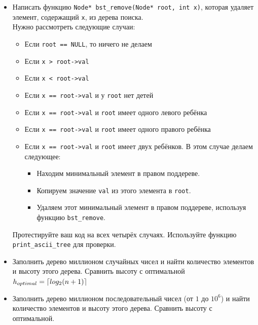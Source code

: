 \documentclass{article}
\DeclarePairedDelimiter\ceil{\lceil}{\rceil}
\begin{document}
\begin{itemize}
\item Написать функцию \texttt{Node* bst\_remove(Node* root, int x)}, которая удаляет элемент, содержащий \texttt{x}, из дерева поиска.\\
Нужно рассмотреть следующие случаи:
\begin{itemize}
\item Если \texttt{root == NULL}, то ничего не делаем
\item Если \texttt{x > root->val}
\item Если \texttt{x < root->val}
\item Если \texttt{x == root->val} и у \texttt{root} нет детей
\item Если \texttt{x == root->val} и \texttt{root} имеет одного левого ребёнка
\item Если \texttt{x == root->val} и \texttt{root} имеет одного правого ребёнка
\item Если \texttt{x == root->val} и \texttt{root} имеет двух ребёнков. В этом случае делаем следующее:
	\begin{itemize}
	\item Находим минимальный элемент в правом поддереве.
	\item Копируем значение \texttt{val} из этого элемента в \texttt{root}.
	\item Удаляем этот минимальный элемент в правом поддереве, используя функцию \texttt{bst\_remove}.
	\end{itemize}
\end{itemize}
Протестируйте ваш код на всех четырёх случаях. Используйте функцию \texttt{print\_ascii\_tree} для проверки.

\item Заполнить дерево миллионом случайных чисел и найти количество элементов и высоту этого дерева. Сравнить высоту с оптимальной $h_{optimal} = \ceil*{log_2(n + 1)}$
\item Заполнить дерево миллионом последовательный чисел (от $1$ до $10^6$) и найти количество элементов и высоту этого дерева. Сравнить высоту с оптимальной.
\end{itemize}
\newpage
\end{document}
